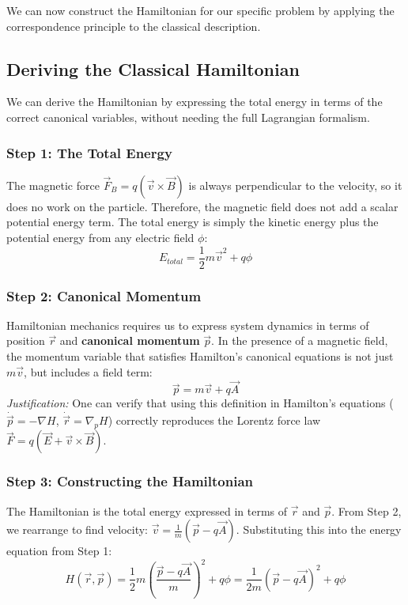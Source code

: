 \documentclass[11pt,a4paper]{article}
\let\oldsubsection\subsection
\renewcommand{\subsection}{\needspace{4\baselineskip}\oldsubsection}
\let\oldsubsubsection\subsubsection
\renewcommand{\subsubsection}{\needspace{3\baselineskip}\oldsubsubsection}
\theoremstyle{definition}
\theoremstyle{remark}
\begin{document}
We can now construct the Hamiltonian for our specific problem by applying the correspondence principle to the classical description.

\subsection{Deriving the Classical Hamiltonian}

We can derive the Hamiltonian by expressing the total energy in terms of the correct canonical variables, without needing the full Lagrangian formalism.

\subsubsection{Step 1: The Total Energy}
The magnetic force $\vec{F}_B = q(\vec{v} \times \vec{B})$ is always perpendicular to the velocity, so it does no work on the particle. Therefore, the magnetic field does not add a scalar potential energy term. The total energy is simply the kinetic energy plus the potential energy from any electric field $\phi$:
\begin{equation}
    E_{total} = \frac{1}{2}m\vec{v}^2 + q\phi
\end{equation}

\subsubsection{Step 2: Canonical Momentum}
Hamiltonian mechanics requires us to express system dynamics in terms of position $\vec{r}$ and \textbf{canonical momentum} $\vec{p}$. In the presence of a magnetic field, the momentum variable that satisfies Hamilton's canonical equations is not just $m\vec{v}$, but includes a field term:
\begin{equation}
    \vec{p} = m\vec{v} + q\vec{A}
\end{equation}
\textit{Justification:} One can verify that using this definition in Hamilton's equations ($\dot{\vec{p}} = -\nabla H$, $\dot{\vec{r}} = \nabla_p H$) correctly reproduces the Lorentz force law $\vec{F} = q(\vec{E} + \vec{v} \times \vec{B})$.

\subsubsection{Step 3: Constructing the Hamiltonian}
The Hamiltonian is the total energy expressed in terms of $\vec{r}$ and $\vec{p}$.
From Step 2, we rearrange to find velocity: $\vec{v} = \frac{1}{m}(\vec{p} - q\vec{A})$.
Substituting this into the energy equation from Step 1:
\begin{equation}
    H(\vec{r}, \vec{p}) = \frac{1}{2}m \left( \frac{\vec{p} - q\vec{A}}{m} \right)^2 + q\phi = \frac{1}{2m}(\vec{p} - q\vec{A})^2 + q\phi
\end{equation}
\end{document}
